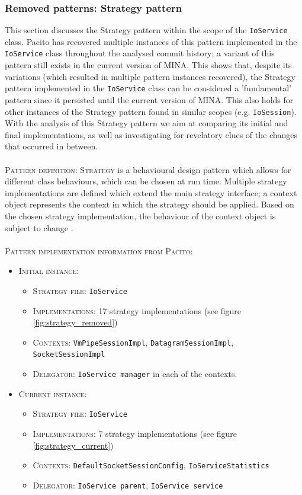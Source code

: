\subsubsection{Removed patterns: Strategy pattern}
This section discusses the Strategy pattern within the scope of the \texttt{IoService} class. Pacito has recovered multiple instances of this pattern implemented in the \texttt{IoService} class throughout the analysed commit history; a variant of this pattern still exists in the current version of MINA. This shows that, despite its variations (which resulted in multiple pattern instances recovered), the Strategy pattern implemented in the \texttt{IoService} class can be considered a 'fundamental' pattern since it persisted until the current version of MINA. This also holds for other instances of the Strategy pattern found in similar scopes (e.g. \texttt{IoSession}). With the analysis of this Strategy pattern we aim at comparing its initial and final implementations, as well as investigating for revelatory clues of the changes that occurred in between.\\\\
\textsc{Pattern definition}: \textsc{Strategy} is a behavioural design pattern which allows for different class behaviours, which can be chosen at run time. Multiple strategy implementations are defined which extend the main strategy interface; a context object represents the context in which the strategy should be applied. Based on the chosen strategy implementation, the behaviour of the context object is subject to change \cite{strategy}\cite{strategy1}.\\\\
\textsc{Pattern implementation information from Pacito}:
\begin{itemize}
    \item \textsc{Initial instance}:
        \begin{itemize}
            \item \textsc{Strategy file}: \texttt{IoService}
            \item \textsc{Implementations}: 17 strategy implementations (see figure \ref{fig:strategy_removed})
            \item \textsc{Contexts}: \texttt{VmPipeSessionImpl}, \texttt{DatagramSessionImpl}, \texttt{SocketSessionImpl}
            \item \textsc{Delegator}: \texttt{IoService manager} in each of the contexts. 
        \end{itemize}
    \item \textsc{Current instance}:
        \begin{itemize}
            \item \textsc{Strategy file}: \texttt{IoService}
            \item \textsc{Implementations}: 7 strategy implementations (see figure \ref{fig:strategy_current})
            \item \textsc{Contexts}: \texttt{DefaultSocketSessionConfig}, \texttt{IoServiceStatistics}
            \item \textsc{Delegator}: \texttt{IoService parent}, \texttt{IoService service} 
        \end{itemize}
\end{itemize}
